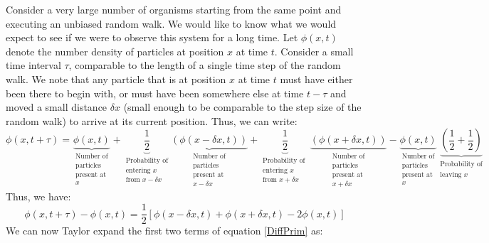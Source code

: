 Consider a very large number of organisms starting from the same point and executing an unbiased random walk. We would like to know what we would expect to see if we were to observe this system for a long time. Let $\phi(x,t)$ denote the number density of particles at position $x$ at time $t$. Consider a small time interval $\tau$, comparable to the length of a single time step of the random walk. We note that any particle that is at position $x$ at time $t$ must have either been there to begin with, or must have been somewhere else at time $t-\tau$ and moved a small distance $\delta x$ (small enough to be comparable to the step size of the random walk) to arrive at its current position. Thus, we can write:
\begin{equation}
	\label{derive_diff_eqn}
	\phi(x,t+\tau) = \underbrace{\phi(x,t)}_{\substack{\text{Number of}\\ \text{particles}\\ \text{present at}\\\text{$x$}}} + \underbrace{\frac{1}{2}}_{\substack{\text{Probability of}\\ \text{entering $x$}\\ \text{from $x - \delta x$}}}\underbrace{(\phi(x-\delta x,t))}_{\substack{\text{Number of}\\ \text{particles}\\ \text{present at}\\ \text{$x-\delta x$}}} + \underbrace{\frac{1}{2}}_{\substack{\text{Probability of }\\ \text{entering $x$}\\ \text{from $x+\delta x$}}}\underbrace{(\phi(x+\delta x,t))}_{\substack{\text{Number of}\\ \text{particles}\\ \text{present at}\\ \text{$x + \delta x$}}} - \underbrace{\phi(x,t)}_{\substack{\text{Number of}\\ \text{particles}\\ \text{present at}\\ \text{$x$}}}\underbrace{(\frac{1}{2} + \frac{1}{2})}_{\substack{\text{Probability of}\\ \text{leaving $x$}}}
\end{equation}
Thus, we have:
\begin{equation}
	\label{DiffPrim}
	\phi(x,t+\tau) - \phi(x,t) = \frac{1}{2}\left[\phi(x-\delta x,t) + \phi(x + \delta x,t) - 2\phi(x,t)\right]
\end{equation}
We can now Taylor expand the first two terms of equation \eqref{DiffPrim} as:
